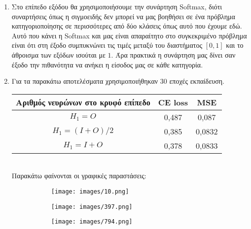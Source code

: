 \documentclass[12pt,a4paper]{article}
\newcommand{\tl}{\textlatin}
\begin{document}
\begin{enumerate}[a]
        \item Στο επίπεδο εξόδου θα χρησιμοποιήσουμε την συνάρτηση \tl{Softmax}, διότι συναρτήσεις όπως  η σιγμοειδής δεν μπορεί να μας βοηθήσει σε ένα πρόβλημα κατηγοριοποίησης σε περισσότερες από δύο κλάσεις όπως αυτό που έχουμε εδώ.  Αυτό που κάνει η \tl{Softmax} και μας είναι απαραίτητο στο συγκεκριμένο πρόβλημα είναι ότι στη έξοδο συμπυκνώνει τις τιμές μεταξύ του διαστήματος $[0,1]$ και το άθροισμα των εξόδων ισούται με $1$. Άρα πρακτικά η συνάρτηση μας δίνει σαν έξοδο την πιθανότητα να ανήκει η είσοδος μας σε κάθε κατηγορία.

        \item Για τα παρακάτω αποτελέσματα χρησιμοποιήθηκαν 30 εποχές εκπαίδευση.

            \begin{tabular}{|c | c | c | }
                \hline
                Αριθμός νευρώνων στο κρυφό επίπεδο & \tl{CE loss} & \tl{MSE} \\
                \hline
                $H_1 = O$       & 0,487 & 0,087 \\ 
                $H_1 = (I+O)/2$ & 0,385 & 0,0832 \\ 
                $H_1 = I+O$     & 0,378 & 0,0833 \\
                \hline 
            \end{tabular} \\
            
            Παρακάτω φαίνονται οι γραφικές παραστάσεις: 
            \begin{figure}[H]
                \raggedright
                    \begin{subfigure}[t]{0.5\textwidth}
                        \texttt{[image: images/10.png]}
                    \end{subfigure}
                    \begin{subfigure}[t]{0.5\textwidth}
                        \texttt{[image: images/397.png]} 
                    \end{subfigure}
                    \begin{subfigure}[t]{0.5\textwidth}
                        \texttt{[image: images/794.png]} 
                    \end{subfigure}
            \end{figure}


\end{enumerate}
\end{document}
